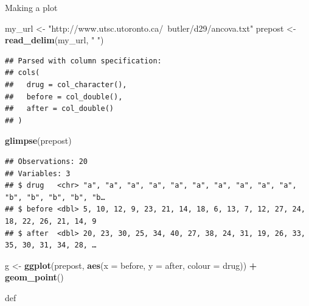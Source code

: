 \documentclass[ignorenonframetext,]{beamer}
\newenvironment{Shaded}{\begin{snugshade}}{\end{snugshade}}
\newcommand{\DataTypeTok}[1]{\textcolor[rgb]{0.13,0.29,0.53}{#1}}
\newcommand{\KeywordTok}[1]{\textcolor[rgb]{0.13,0.29,0.53}{\textbf{#1}}}
\newcommand{\NormalTok}[1]{#1}
\newcommand{\OperatorTok}[1]{\textcolor[rgb]{0.81,0.36,0.00}{\textbf{#1}}}
\newcommand{\StringTok}[1]{\textcolor[rgb]{0.31,0.60,0.02}{#1}}
\begin{document}
\begin{frame}[fragile]{Making a plot}
\protect\hypertarget{making-a-plot-1}{}

\begin{Shaded}
\begin{Highlighting}[]
\NormalTok{my_url <-}\StringTok{ "http://www.utsc.utoronto.ca/~butler/d29/ancova.txt"}
\NormalTok{prepost <-}\StringTok{ }\KeywordTok{read_delim}\NormalTok{(my_url, }\StringTok{" "}\NormalTok{)}
\end{Highlighting}
\end{Shaded}

\begin{verbatim}
## Parsed with column specification:
## cols(
##   drug = col_character(),
##   before = col_double(),
##   after = col_double()
## )
\end{verbatim}

\begin{Shaded}
\begin{Highlighting}[]
\KeywordTok{glimpse}\NormalTok{(prepost)}
\end{Highlighting}
\end{Shaded}

\begin{verbatim}
## Observations: 20
## Variables: 3
## $ drug   <chr> "a", "a", "a", "a", "a", "a", "a", "a", "a", "a", "b", "b", "b", "b", "b…
## $ before <dbl> 5, 10, 12, 9, 23, 21, 14, 18, 6, 13, 7, 12, 27, 24, 18, 22, 26, 21, 14, 9
## $ after  <dbl> 20, 23, 30, 25, 34, 40, 27, 38, 24, 31, 19, 26, 33, 35, 30, 31, 34, 28, …
\end{verbatim}

\begin{Shaded}
\begin{Highlighting}[]
\NormalTok{g <-}\StringTok{ }\KeywordTok{ggplot}\NormalTok{(prepost, }\KeywordTok{aes}\NormalTok{(}\DataTypeTok{x =}\NormalTok{ before, }\DataTypeTok{y =}\NormalTok{ after, }\DataTypeTok{colour =}\NormalTok{ drug)) }\OperatorTok{+}
\StringTok{  }\KeywordTok{geom_point}\NormalTok{()}
\end{Highlighting}
\end{Shaded}

def

\end{frame}
\end{document}

